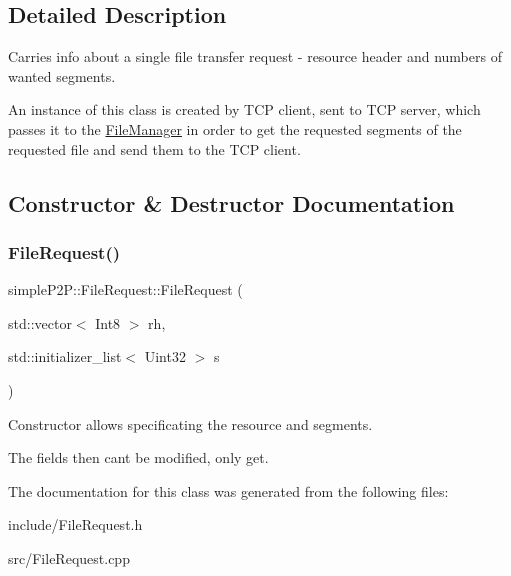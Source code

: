 \subsection{Detailed Description}
Carries info about a single file transfer request -\/ resource header and numbers of wanted segments. 

An instance of this class is created by T\+CP client, sent to T\+CP server, which passes it to the \hyperlink{classsimpleP2P_1_1FileManager}{File\+Manager} in order to get the requested segments of the requested file and send them to the T\+CP client. 

\subsection{Constructor \& Destructor Documentation}
\mbox{\label{classsimpleP2P_1_1FileRequest_a10e638217e87f34d01c527b919e238e4}} 
\subsubsection{\texorpdfstring{File\+Request()}{FileRequest()}}
{\footnotesize\ttfamily simple\+P2\+P\+::\+File\+Request\+::\+File\+Request (\begin{DoxyParamCaption}\item[{std\+::vector$<$ Int8 $>$}]{rh,  }\item[{std\+::initializer\+\_\+list$<$ Uint32 $>$}]{s }\end{DoxyParamCaption})}



Constructor allows specificating the resource and segments. 

The fields then can\textquotesingle{}t be modified, only get. 

The documentation for this class was generated from the following files\+:\begin{DoxyCompactItemize}
\item 
include/File\+Request.\+h\item 
src/File\+Request.\+cpp\end{DoxyCompactItemize}
